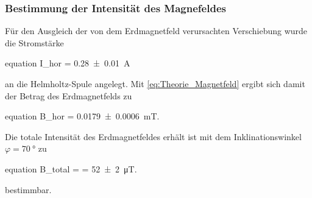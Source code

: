 	\subsubsection{Bestimmung der Intensität des Magnefeldes}
	
		Für den Ausgleich der von dem Erdmagnetfeld verursachten Verschiebung wurde die Stromstärke
 		\begin{empheq}{equation}
 			I_{hor} = \SI{0.28(1)}{\ampere}
 		\end{empheq}
		an die Helmholtz-Spule angelegt. Mit \cref{eq:Theorie_Magnetfeld} 
		ergibt sich damit der Betrag des Erdmagnetfelds zu 
 		\begin{empheq}{equation}
 			B_{hor} = \SI{0.0179(6)}{\milli\tesla}.
 		\end{empheq}
 		
 		Die totale Intensität des Erdmagnetfeldes erhält ist mit dem Inklinationswinkel 
 		$\varphi = \SI{70}{\degree}$ zu
 		\begin{empheq}{equation}
 			B_{total} =  = \SI{52(2)}{\micro\tesla}.
 		\end{empheq}
 		bestimmbar.
